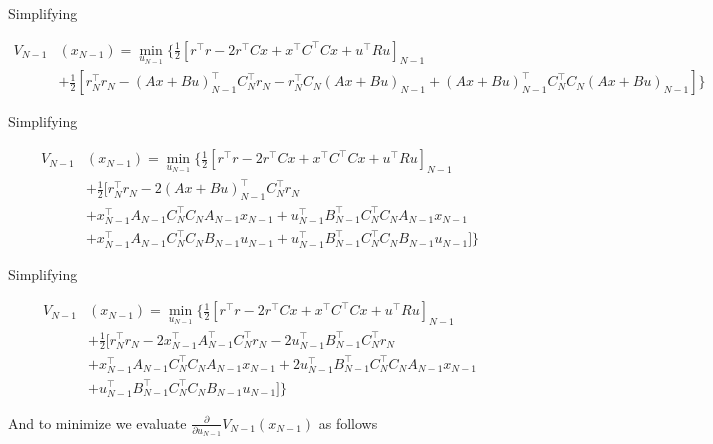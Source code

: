 \documentclass[11pt,letterpaper,onecolumn,notitlepage]{article}
\begin{document}
Simplifying

\begin{equation*}
  \begin{split}
    V_{N-1}&(x_{N-1})=\min_{u_{N-1}}\biggr\{\frac{1}{2}\left[r^{\top}r-2r^{\top}Cx+x^{\top}C^{\top}Cx+u^{\top}Ru\right]_{N-1} \\
    &+\frac{1}{2}\left[r_{N}^{\top}r_{N}-(Ax+Bu)_{N-1}^{\top}C_{N}^{\top}r_{N}-r_{N}^{\top}C_{N}(Ax+Bu)_{N-1}+(Ax+Bu)_{N-1}^{\top}C_{N}^{\top}C_{N}(Ax+Bu)_{N-1}\right]\biggr\}
  \end{split}
\end{equation*}

Simplifying

\begin{equation*}
  \begin{split}
    V_{N-1}&(x_{N-1})=\min_{u_{N-1}}\biggr\{\frac{1}{2}\left[r^{\top}r-2r^{\top}Cx+x^{\top}C^{\top}Cx+u^{\top}Ru\right]_{N-1} \\
    &+\frac{1}{2}\bigr[r_{N}^{\top}r_{N}-2(Ax+Bu)_{N-1}^{\top}C_{N}^{\top}r_{N} \\
    &+x_{N-1}^{\top}A_{N-1}C_{N}^{\top}C_{N}A_{N-1}x_{N-1}
    +u_{N-1}^{\top}B_{N-1}^{\top}C_{N}^{\top}C_{N}A_{N-1}x_{N-1} \\
    &+x_{N-1}^{\top}A_{N-1}C_{N}^{\top}C_{N}B_{N-1}u_{N-1}
    +u_{N-1}^{\top}B_{N-1}^{\top}C_{N}^{\top}C_{N}B_{N-1}u_{N-1}
    \bigr]\biggr\}
  \end{split}
\end{equation*}

Simplifying

\begin{equation*}
  \begin{split}
    V_{N-1}&(x_{N-1})=\min_{u_{N-1}}\biggr\{\frac{1}{2}\left[r^{\top}r-2r^{\top}Cx+x^{\top}C^{\top}Cx+u^{\top}Ru\right]_{N-1} \\
    &+\frac{1}{2}\bigr[r_{N}^{\top}r_{N}
    -2x_{N-1}^{\top}A_{N-1}^{\top}C_{N}^{\top}r_{N}-2u_{N-1}^{\top}B_{N-1}^{\top}C_{N}^{\top}r_{N} \\
    &+x_{N-1}^{\top}A_{N-1}C_{N}^{\top}C_{N}A_{N-1}x_{N-1}
    +2u_{N-1}^{\top}B_{N-1}^{\top}C_{N}^{\top}C_{N}A_{N-1}x_{N-1} \\
    &+u_{N-1}^{\top}B_{N-1}^{\top}C_{N}^{\top}C_{N}B_{N-1}u_{N-1}
    \bigr]\biggr\}
  \end{split}
\end{equation*}

And to minimize we evaluate $\frac{\partial}{\partial u_{N-1}}V_{N-1}(x_{N-1})$ as follows
\end{document}
